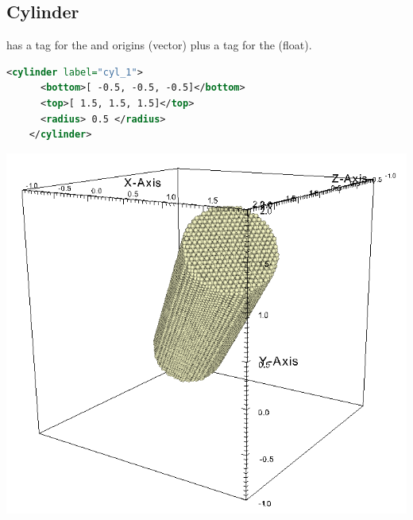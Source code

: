 \subsection{Cylinder}
\begin{minipage}{0.6\textwidth}
   has a tag for the  and  origins
  (vector) plus a tag for the  (float).
  \begin{lstlisting}[language=XML]
    <cylinder label="cyl_1">
      <bottom>[ -0.5, -0.5, -0.5]</bottom>
      <top>[ 1.5, 1.5, 1.5]</top>
      <radius> 0.5 </radius>
    </cylinder>
  \end{lstlisting}
\end{minipage}
\begin{minipage}{0.4\textwidth}
  \centering
  \includegraphics[width=0.9\columnwidth]{FIGS/geometry/geom_cyl.png}
\end{minipage}

